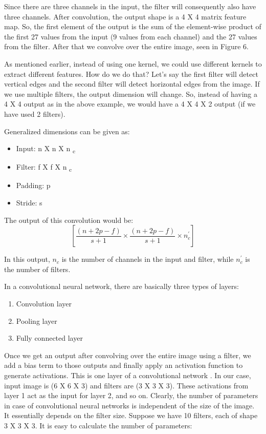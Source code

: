 Since there are three channels in the input, the filter will consequently also have three channels. After convolution, the output shape is a 4 X 4 matrix feature map. So, the first element of the output is the sum of the element-wise product of the first 27 values from the input (9 values from each channel) and the 27 values from the filter. After that we convolve over the entire image, seen in Figure 6.
\par
As mentioned earlier, instead of using one kernel, we could use different kernels to extract different features. How do we do that? Let’s say the first filter will detect vertical edges and the second filter will detect horizontal edges from the image. If we use multiple filters, the output dimension will change. So, instead of having a 4 X 4 output as in the above example, we would have a 4 X 4 X 2 output (if we have used 2 filters).
\par
Generalized dimensions can be given as:
\begin{itemize}
  \item Input: n X n X n \textsubscript{c}
  \item Filter: f X f X n \textsubscript{c}
  \item Padding: p
  \item Stride: s
\end{itemize}

The output of this convolution would be:
$$ [\frac{(n+2p-f)}{s+1} \times \frac{(n+2p-f)}{s+1} \times n_{c}^\prime] $$

In this output, $n_c$ is the number of channels in the input and filter, while $ n_c^\prime $ is the number of filters.

In a convolutional neural network, there are basically three types of layers:

\begin{enumerate}
  \item Convolution layer
  \item Pooling layer
  \item Fully connected layer
\end{enumerate}

Once we get an output after convolving over the entire image using a filter, we add a bias term to those outputs and finally apply an activation function to generate activations. This is one layer of a convolutional network . In our case, input image is (6 X 6 X 3) and filters are (3 X 3 X 3). These activations from layer 1 act as the input for layer 2, and so on. Clearly, the number of parameters in case of convolutional neural networks is independent of the size of the image. It essentially depends on the filter size. Suppose we have 10 filters, each of shape 3 X 3 X 3. It is easy to calculate the number of parameters:

